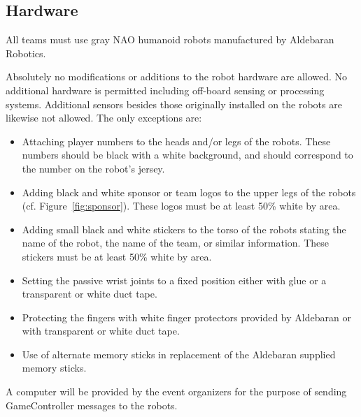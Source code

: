 \documentclass[12pt]{article}
\newcommand{\cf}{\mbox{cf.}\xspace}
\begin{document}
\subsection{Hardware}
\label{sec:hardware}
All teams must use gray NAO humanoid robots manufactured by Aldebaran Robotics. 

Absolutely no modifications or additions to the robot hardware are allowed. No additional hardware is permitted including off-board sensing or processing systems. Additional sensors besides those originally installed on the robots are likewise not allowed. The only exceptions are:

\begin{itemize}

\item Attaching player numbers to the heads and/or legs of the robots.  These numbers should be black with a white background, and should correspond to the number on the robot's jersey.

\item Adding black and white sponsor or team logos to the upper legs of the robots (\cf Figure~\ref{fig:sponsor}). These logos must be at least 50\% white by area.

\item Adding small black and white stickers to the torso of the robots stating the name of the robot, the name of the team, or similar information. These stickers must be at least 50\% white by area.

\item Setting the passive wrist joints to a fixed position either with glue or a transparent or white duct tape.

\item Protecting the fingers with white finger protectors provided by Aldebaran or with transparent or white duct tape.

\item Use of alternate memory sticks in replacement of the Aldebaran supplied memory sticks.

\end{itemize}

A computer will be provided by the event organizers for the purpose of sending GameController messages to the robots.
\end{document}

